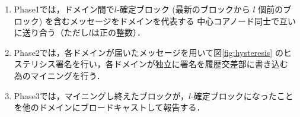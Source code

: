 \documentclass[a4paper,12pt]{jsarticle}
\begin{document}
\hspace{5mm}
%
\begin{enumerate}
\item Phase1では，ドメイン間で$l$-確定ブロック (最新のブロックから 
      $l$ 個前のブロック) を含むメッセージをドメインを代表する
      中心コアノード同士で互いに送り合う（ただし$l$は正の整数）．

\item Phase2では，各ドメインが届いたメッセージを用いて図\ref{fig:hysteresis}
      のヒステリシス署名を行い，各ドメインが独立に署名を履歴交差部に書き込む
      為のマイニングを行う．

\item Phase3では，マイニングし終えたブロックが，$l$-確定ブロックになったこと
      を他のドメインにブロードキャストして報告する．
\end{enumerate}
%
\hspace{5mm}
\end{document}
